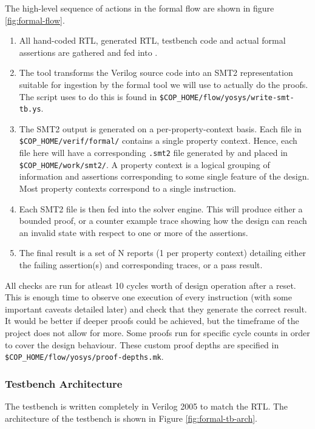 The high-level sequence of actions in the formal flow are shown in figure
\ref{fig:formal-flow}.

\begin{enumerate}
\item All hand-coded RTL, generated RTL, testbench code and actual
    formal assertions are gathered and fed into \yosys.
\item The \yosys tool transforms the Verilog source code into an SMT2
    representation suitable for ingestion by the formal tool we will use
    to actually do the proofs.
    The script \yosys uses to do this is found in
    {\tt \$COP\_HOME/flow/yosys/write-smt-tb.ys}.
\item The SMT2 output is generated on a per-property-context basis.
    Each file in
    {\tt \$COP\_HOME/verif/formal/}
    contains a single property context.
    Hence, each file here will have a corresponding {\tt .smt2}
    file generated by \yosys and placed in
    {\tt \$COP\_HOME/work/smt2/}.
    A property context is a logical grouping of information and assertions
    corresponding to some single feature of the design.
    Most property contexts correspond to a single instruction.
\item Each SMT2 file is then fed into the solver engine.
    This will produce either a bounded proof, or a counter example trace
    showing how the design can reach an invalid state with respect to
    one or more of the assertions.
\item The final result is a set of N reports (1 per property context)
    detailing either the failing assertion(s) and corresponding traces,
    or a pass result.
\end{enumerate}

All checks are run for atleast 10 cycles worth of design operation after
a reset.
This is enough time to observe one execution of every instruction (with
some important caveats detailed later) and check that they generate the
correct result.
It would be better if deeper proofs could be achieved, but the timeframe of
the project does not allow for more.
Some proofs run for specific cycle counts in order to cover the design
behaviour.
These custom proof depths are specified in 
{\tt \$COP\_HOME/flow/yosys/proof-depths.mk}.

\subsubsection{Testbench Architecture}

The testbench is written completely in Verilog 2005 to match the RTL.
The architecture of the testbench is shown in Figure
\ref{fig:formal-tb-arch}.

